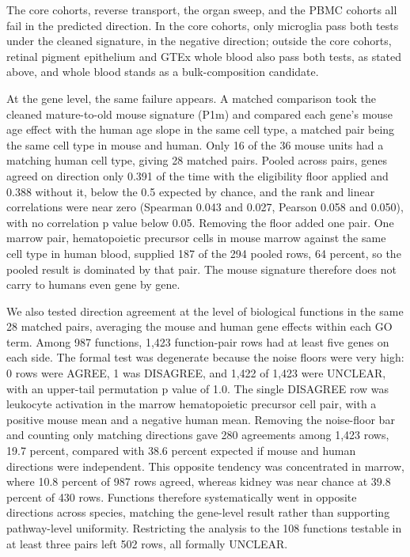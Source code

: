 \documentclass[11pt]{article}
\begin{document}
The core cohorts, reverse transport, the organ sweep, and the PBMC cohorts all fail in the predicted direction. In the core cohorts, only microglia pass both tests under the cleaned signature, in the negative direction; outside the core cohorts, retinal pigment epithelium and GTEx whole blood also pass both tests, as stated above, and whole blood stands as a bulk-composition candidate.

At the gene level, the same failure appears. A matched comparison took the cleaned mature-to-old mouse signature (P1m) and compared each gene's mouse age effect with the human age slope in the same cell type, a matched pair being the same cell type in mouse and human. Only 16 of the 36 mouse units had a matching human cell type, giving 28 matched pairs. Pooled across pairs, genes agreed on direction only 0.391 of the time with the eligibility floor applied and 0.388 without it, below the 0.5 expected by chance, and the rank and linear correlations were near zero (Spearman 0.043 and 0.027, Pearson 0.058 and 0.050), with no correlation p value below 0.05. Removing the floor added one pair. One marrow pair, hematopoietic precursor cells in mouse marrow against the same cell type in human blood, supplied 187 of the 294 pooled rows, 64 percent, so the pooled result is dominated by that pair. The mouse signature therefore does not carry to humans even gene by gene.

We also tested direction agreement at the level of biological functions in the same 28 matched pairs, averaging the mouse and human gene effects within each GO term. Among 987 functions, 1,423 function-pair rows had at least five genes on each side. The formal test was degenerate because the noise floors were very high: 0 rows were AGREE, 1 was DISAGREE, and 1,422 of 1,423 were UNCLEAR, with an upper-tail permutation p value of 1.0. The single DISAGREE row was leukocyte activation in the marrow hematopoietic precursor cell pair, with a positive mouse mean and a negative human mean. Removing the noise-floor bar and counting only matching directions gave 280 agreements among 1,423 rows, 19.7 percent, compared with 38.6 percent expected if mouse and human directions were independent. This opposite tendency was concentrated in marrow, where 10.8 percent of 987 rows agreed, whereas kidney was near chance at 39.8 percent of 430 rows. Functions therefore systematically went in opposite directions across species, matching the gene-level result rather than supporting pathway-level uniformity. Restricting the analysis to the 108 functions testable in at least three pairs left 502 rows, all formally UNCLEAR.
\end{document}
